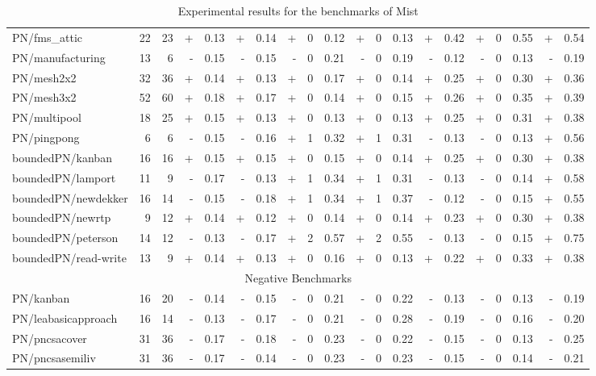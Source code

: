 \documentclass{article}
\newcommand{\mist}{{\sc Mist}}
\begin{document}
\begin{table}[h]
\begin{center}
\begin{tabular}{ | l | r | r | *{17}{ r | } }
PN/fms\_attic & 22 & 23 & + & 0.13 & + & 0.14 & + & 0 & 0.12 & + & 0 & 0.13 & + & 0.42 & + & 0 & 0.55 & + & 0.54 \\
PN/manufacturing & 13 & 6 & - & 0.15 & - & 0.15 & - & 0 & 0.21 & - & 0 & 0.19 & - & 0.12 & - & 0 & 0.13 & - & 0.19 \\
PN/mesh2x2 & 32 & 36 & + & 0.14 & + & 0.13 & + & 0 & 0.17 & + & 0 & 0.14 & + & 0.25 & + & 0 & 0.30 & + & 0.36 \\
PN/mesh3x2 & 52 & 60 & + & 0.18 & + & 0.17 & + & 0 & 0.14 & + & 0 & 0.15 & + & 0.26 & + & 0 & 0.35 & + & 0.39 \\
PN/multipool & 18 & 25 & + & 0.15 & + & 0.13 & + & 0 & 0.13 & + & 0 & 0.13 & + & 0.25 & + & 0 & 0.31 & + & 0.38 \\
PN/pingpong & 6 & 6 & - & 0.15 & - & 0.16 & + & 1 & 0.32 & + & 1 & 0.31 & - & 0.13 & - & 0 & 0.13 & + & 0.56 \\
boundedPN/kanban & 16 & 16 & + & 0.15 & + & 0.15 & + & 0 & 0.15 & + & 0 & 0.14 & + & 0.25 & + & 0 & 0.30 & + & 0.38 \\
boundedPN/lamport & 11 & 9 & - & 0.17 & - & 0.13 & + & 1 & 0.34 & + & 1 & 0.31 & - & 0.13 & - & 0 & 0.14 & + & 0.58 \\
boundedPN/newdekker & 16 & 14 & - & 0.15 & - & 0.18 & + & 1 & 0.34 & + & 1 & 0.37 & - & 0.12 & - & 0 & 0.15 & + & 0.55 \\
boundedPN/newrtp & 9 & 12 & + & 0.14 & + & 0.12 & + & 0 & 0.14 & + & 0 & 0.14 & + & 0.23 & + & 0 & 0.30 & + & 0.38 \\
boundedPN/peterson & 14 & 12 & - & 0.13 & - & 0.17 & + & 2 & 0.57 & + & 2 & 0.55 & - & 0.13 & - & 0 & 0.15 & + & 0.75 \\
boundedPN/read-write & 13 & 9 & + & 0.14 & + & 0.13 & + & 0 & 0.16 & + & 0 & 0.13 & + & 0.22 & + & 0 & 0.33 & + & 0.38 \\
    \hline
        \multicolumn{20}{|c|}{Negative Benchmarks} \\
    \hline
PN/kanban & 16 & 20 & - & 0.14 & - & 0.15 & - & 0 & 0.21 & - & 0 & 0.22 & - & 0.13 & - & 0 & 0.13 & - & 0.19 \\
PN/leabasicapproach & 16 & 14 & - & 0.13 & - & 0.17 & - & 0 & 0.21 & - & 0 & 0.28 & - & 0.19 & - & 0 & 0.16 & - & 0.20 \\
PN/pncsacover & 31 & 36 & - & 0.17 & - & 0.18 & - & 0 & 0.23 & - & 0 & 0.22 & - & 0.15 & - & 0 & 0.13 & - & 0.25 \\
PN/pncsasemiliv & 31 & 36 & - & 0.17 & - & 0.14 & - & 0 & 0.23 & - & 0 & 0.23 & - & 0.15 & - & 0 & 0.14 & - & 0.21 \\
    \hline
  \end{tabular}
\end{center}
\caption{Experimental results for the benchmarks of \mist}
\label{mist-experiments}
\end{table}
\end{document}
